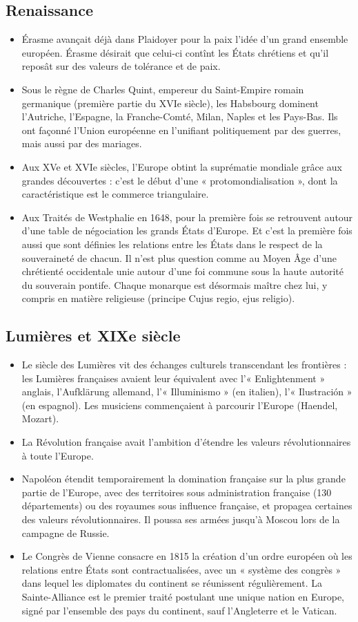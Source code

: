 \documentclass{report}%
\begin{document}
\subsection{Renaissance}
	\begin{itemize}
		\item Érasme avançait déjà dans Plaidoyer pour la paix l'idée d'un grand ensemble européen. Érasme désirait que celui-ci contînt les États chrétiens et qu'il reposât sur des valeurs de tolérance et de paix.
		\item Sous le règne de Charles Quint, empereur du Saint-Empire romain germanique (première partie du XVIe siècle), les Habsbourg dominent l'Autriche, l'Espagne, la Franche-Comté, Milan, Naples et les Pays-Bas. Ils ont façonné l'Union européenne en l'unifiant politiquement par des guerres, mais aussi par des mariages.
		\item Aux XVe et XVIe siècles, l'Europe obtint la suprématie mondiale grâce aux grandes découvertes : c'est le début d'une « protomondialisation », dont la caractéristique est le commerce triangulaire.
		\item Aux Traités de Westphalie en 1648, pour la première fois se retrouvent autour d'une table de négociation les grands États d'Europe. Et c'est la première fois aussi que sont définies les relations entre les États dans le respect de la souveraineté de chacun. Il n'est plus question comme au Moyen Âge d'une chrétienté occidentale unie autour d'une foi commune sous la haute autorité du souverain pontife. Chaque monarque est désormais maître chez lui, y compris en matière religieuse (principe Cujus regio, ejus religio).
	\end{itemize}
\subsection{Lumières et XIXe siècle}
	\begin{itemize}
		\item Le siècle des Lumières vit des échanges culturels transcendant les frontières : les Lumières françaises avaient leur équivalent avec l'« Enlightenment » anglais, l'Aufklärung allemand, l'« Illuminismo » (en italien), l'« Ilustración » (en espagnol). Les musiciens commençaient à parcourir l'Europe (Haendel, Mozart).
		\item La Révolution française avait l'ambition d'étendre les valeurs révolutionnaires à toute l'Europe.
		\item Napoléon étendit temporairement la domination française sur la plus grande partie de l'Europe, avec des territoires sous administration française (130 départements) ou des royaumes sous influence française, et propagea certaines des valeurs révolutionnaires. Il poussa ses armées jusqu'à Moscou lors de la campagne de Russie.
		\item Le Congrès de Vienne consacre en 1815 la création d'un ordre européen où les relations entre États sont contractualisées, avec un « système des congrès » dans lequel les diplomates du continent se réunissent régulièrement. La Sainte-Alliance est le premier traité postulant une unique nation en Europe, signé par l'ensemble des pays du continent, sauf l'Angleterre et le Vatican.
	\end{itemize}
\end{document}
